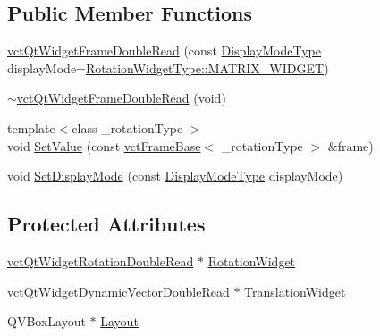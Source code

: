 \subsection*{Public Member Functions}
\begin{DoxyCompactItemize}
\item 
\hyperlink{classvct_qt_widget_frame_double_read_a924d392fbb54088961946d42f4da3a33}{vct\+Qt\+Widget\+Frame\+Double\+Read} (const \hyperlink{classvct_qt_widget_rotation_double_read_a77ae5a0ee5fe231ad2f9dd020aad434c}{Display\+Mode\+Type} display\+Mode=\hyperlink{classvct_qt_widget_rotation_double_read_a77ae5a0ee5fe231ad2f9dd020aad434cab4e7af571815b292da348c3526627d1e}{Rotation\+Widget\+Type\+::\+M\+A\+T\+R\+I\+X\+\_\+\+W\+I\+D\+G\+E\+T})
\item 
\hyperlink{classvct_qt_widget_frame_double_read_a787ed1ae3145a669a88b1bf8f10acb60}{$\sim$vct\+Qt\+Widget\+Frame\+Double\+Read} (void)
\item 
{\footnotesize template$<$class \+\_\+rotation\+Type $>$ }\\void \hyperlink{classvct_qt_widget_frame_double_read_a6bc1671d1d18c319dbf26457aae9a783}{Set\+Value} (const \hyperlink{classvct_frame_base}{vct\+Frame\+Base}$<$ \+\_\+rotation\+Type $>$ \&frame)
\item 
void \hyperlink{classvct_qt_widget_frame_double_read_a55e420ec71d99dd8a7b8cdd05e408740}{Set\+Display\+Mode} (const \hyperlink{classvct_qt_widget_rotation_double_read_a77ae5a0ee5fe231ad2f9dd020aad434c}{Display\+Mode\+Type} display\+Mode)
\end{DoxyCompactItemize}
\subsection*{Protected Attributes}
\begin{DoxyCompactItemize}
\item 
\hyperlink{classvct_qt_widget_rotation_double_read}{vct\+Qt\+Widget\+Rotation\+Double\+Read} $\ast$ \hyperlink{classvct_qt_widget_frame_double_read_a7044426a9061234c402ba1ce2f64113d}{Rotation\+Widget}
\item 
\hyperlink{vct_qt_forward_declarations_8h_a6cbce1b6d338096215fc40cb0fdfb848}{vct\+Qt\+Widget\+Dynamic\+Vector\+Double\+Read} $\ast$ \hyperlink{classvct_qt_widget_frame_double_read_a2795e93ee9010d34c7e5af32f555ecdd}{Translation\+Widget}
\item 
Q\+V\+Box\+Layout $\ast$ \hyperlink{classvct_qt_widget_frame_double_read_a084b914e4eb2577cb495d249b441694e}{Layout}
\end{DoxyCompactItemize}


